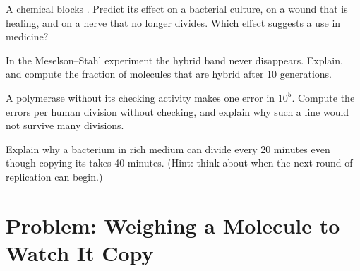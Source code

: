 \begin{exercise}[$\star\star\star$]\label{exo:g11:dna-replication:12}
A chemical blocks . Predict its effect on a bacterial
culture, on a wound that is healing, and on a nerve  that no longer
divides. Which effect suggests a use in medicine?
\end{exercise}

\begin{exercise}[$\star\star\star$]\label{exo:g11:dna-replication:13}
In the Meselson--Stahl experiment the hybrid band never disappears.
Explain, and compute the fraction of molecules that are hybrid after
10 generations.
\end{exercise}

\begin{exercise}[$\star\star\star$]\label{exo:g11:dna-replication:14}
A polymerase without its checking activity makes one error in $10^5$.
Compute the errors per human  division without checking, and
explain why such a  line would not survive many divisions.
\end{exercise}

\begin{exercise}[$\star\star\star$]\label{exo:g11:dna-replication:15}
Explain why a bacterium in rich medium can divide every 20 minutes
even though copying its  takes 40 minutes. (Hint: think
about when the next round of replication can begin.)
\end{exercise}

\section{Problem: Weighing a Molecule to Watch It Copy}

